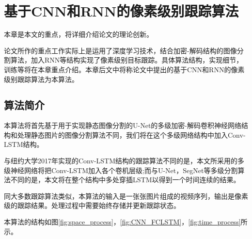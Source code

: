 
\chapter{基于CNN和RNN的像素级别跟踪算法}
本章是本文的重点，将详细介绍论文的理论创新。
\par
论文所作的重点工作实际上是运用了深度学习技术，结合加密-解码结构的图像分割算法，加入RNN等结构实现了像素级别目标跟踪。具体算法结构，实现细节，训练等将在本章重点介绍。本章后文中将称论文中提出的基于CNN和RNN的像素级别跟踪算法为本算法。

\section{算法简介}
本算法将首先基于用于实现静态图像分割的U-Net\supercite{ronneberger2015u}的多级加密-解码卷积神经网络结构和处理静态图片的图像分割算法不同，我们将在这个多级网络结构中加入Conv-LSTM结构。
\par
与纽约大学2017年实现的Conv-LSTM结构的跟踪算法不同的是，本文所采用的多级神经网络将把Conv-LSTM加入各个卷机层级;而与U-Net，SegNet等多级分割算法不同的是，本文将在整个结构中多处穿插LSTM以得到一个时间连续的结果。
\par
同大多数跟踪算法类似，本算法的输入是一张张图片组成的视频序列，输出是像素级的跟踪结果。处理过程中需要始终存储并更新跟踪状态。
\par
本算法的结构如图\ref{fig:space_process}，\ref{fig:CNN_FCLSTM}，\ref{fig:time_process}所示。

